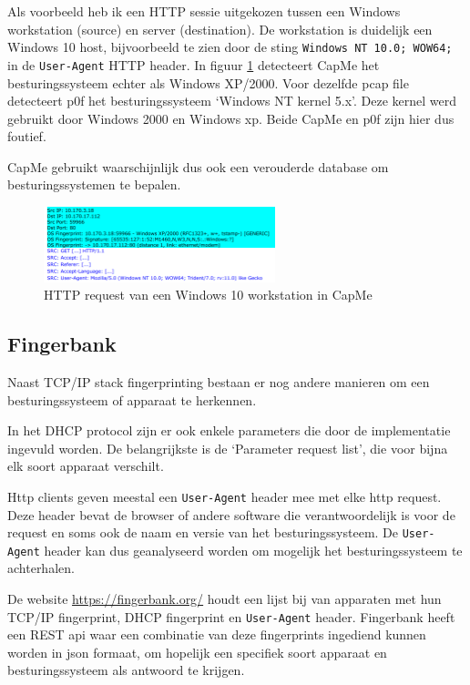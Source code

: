 \documentclass[a4paper,12pt]{report}
\begin{document}
Als voorbeeld heb ik een HTTP sessie uitgekozen tussen een Windows workstation (source) en server (destination).
De workstation is duidelijk een Windows 10 host, bijvoorbeeld te zien door de sting \lstinline|Windows NT 10.0; WOW64;| in de \lstinline|User-Agent| HTTP header.
In figuur \ref{fig:capme-os-detection} detecteert CapMe het besturingssysteem echter als Windows XP/2000.
Voor dezelfde pcap file detecteert p0f het besturingssysteem `Windows NT kernel 5.x'.
Deze kernel werd gebruikt door Windows 2000 en Windows xp.
Beide CapMe en p0f zijn hier dus foutief.

CapMe gebruikt waarschijnlijk dus ook een verouderde database om besturingssystemen te bepalen.

\begin{figure}[H]
  \centering
  \includegraphics[width=0.6\textwidth]{capme-fingerprint}
  \caption{HTTP request van een Windows 10 workstation in CapMe}
  \label{fig:capme-os-detection}
\end{figure}

\subsection{Fingerbank}
\label{sec:fingerbank}
Naast TCP/IP stack fingerprinting bestaan er nog andere manieren om een besturingssysteem of apparaat te herkennen.

In het DHCP protocol zijn er ook enkele parameters die door de implementatie ingevuld worden.
De belangrijkste is de `Parameter request list', die voor bijna elk soort apparaat verschilt.

Http clients geven meestal een \lstinline|User-Agent| header mee met elke http request.
Deze header bevat de browser of andere software die verantwoordelijk is voor de request en soms ook de naam en versie van het besturingssysteem.
De \lstinline|User-Agent| header kan dus geanalyseerd worden om mogelijk het besturingssysteem te achterhalen.

De website \url{https://fingerbank.org/} houdt een lijst bij van apparaten met hun TCP/IP fingerprint, DHCP fingerprint en \lstinline|User-Agent| header.
Fingerbank heeft een REST api waar een combinatie van deze fingerprints ingediend kunnen worden in json formaat, om hopelijk een specifiek soort apparaat en besturingssysteem als antwoord te krijgen.
\end{document}
